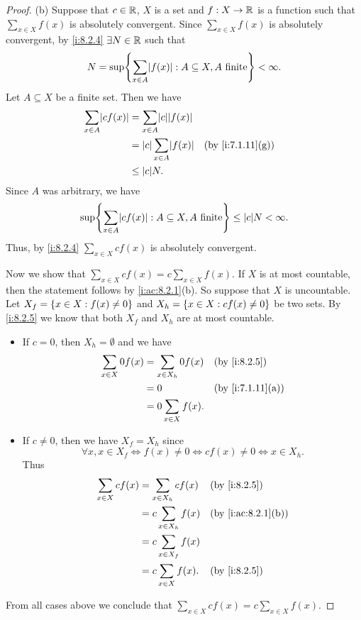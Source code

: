 \begin{proof}{(b)}
  Suppose that \(c \in \mathbb{R}\), \(X\) is a set and \(f : X \to \mathbb{R}\) is a function such that \(\sum_{x \in X} f(x)\) is absolutely convergent.
  Since \(\sum_{x \in X} f(x)\) is absolutely convergent, by \cref{i:8.2.4} \(\exists N \in \mathbb{R}\) such that
  \[
    N = \sup\set{\sum_{x \in A} \abs{f(x)} : A \subseteq X, A \text{ finite}} < \infty.
  \]
  Let \(A \subseteq X\) be a finite set.
  Then we have
  \begin{align*}
    \sum_{x \in A} \abs{cf(x)} & = \sum_{x \in A} \abs{c}\abs{f(x)}                       \\
                               & = \abs{c}\sum_{x \in A} \abs{f(x)} &  & \by{i:7.1.11}[g] \\
                               & \leq \abs{c} N.
  \end{align*}
  Since \(A\) was arbitrary, we have
  \[
    \sup\set{\sum_{x \in A} \abs{cf(x)} : A \subseteq X, A \text{ finite}} \leq \abs{c}N < \infty.
  \]
  Thus, by \cref{i:8.2.4} \(\sum_{x \in X} cf(x)\) is absolutely convergent.

  Now we show that \(\sum_{x \in X} cf(x) = c \sum_{x \in X} f(x)\).
  If \(X\) is at most countable, then the statement follows by \cref{i:ac:8.2.1}(b).
  So suppose that \(X\) is uncountable.
  Let \(X_f = \left\lbrace x \in X : f(x) \neq 0\right\rbrace\) and \(X_h = \left\lbrace x \in X : cf(x) \neq 0\right\rbrace\) be two sets.
  By \cref{i:8.2.5} we know that both \(X_f\) and \(X_h\) are at most countable.
  \begin{itemize}
    \item If \(c = 0\), then \(X_h = \emptyset\) and we have
          \begin{align*}
            \sum_{x \in X} 0f(x) & = \sum_{x \in X_h} 0f(x) &  & \by{i:8.2.5}     \\
                                 & = 0                      &  & \by{i:7.1.11}[a] \\
                                 & = 0 \sum_{x \in X} f(x).
          \end{align*}
    \item If \(c \neq 0\), then we have \(X_f = X_h\) since
          \[
            \forall x, x \in X_f \iff f(x) \neq 0 \iff cf(x) \neq 0 \iff x \in X_h.
          \]
          Thus
          \begin{align*}
            \sum_{x \in X} cf(x) & = \sum_{x \in X_h} cf(x)  &  & \by{i:8.2.5}       \\
                                 & = c \sum_{x \in X_h} f(x) &  & \by{i:ac:8.2.1}[b] \\
                                 & = c \sum_{x \in X_f} f(x)                         \\
                                 & = c \sum_{x \in X} f(x).  &  & \by{i:8.2.5}
          \end{align*}
  \end{itemize}
  From all cases above we conclude that \(\sum_{x \in X} cf(x) = c \sum_{x \in X} f(x)\).
\end{proof}

